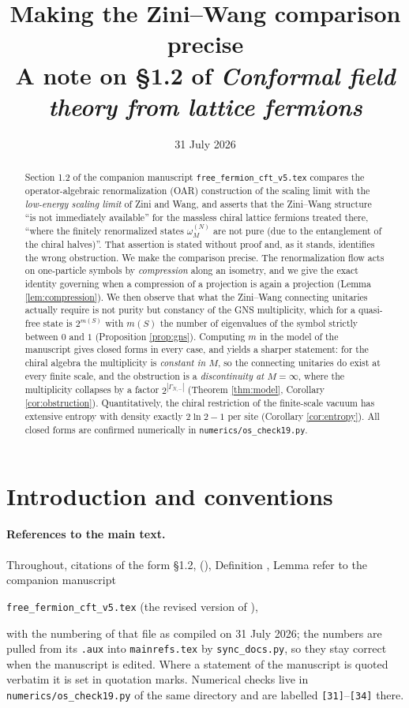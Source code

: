 \documentclass[11pt,a4paper]{article}
\title{\bf Making the Zini--Wang comparison precise\\[0.3cm]
\large A note on \S1.2 of \emph{Conformal field theory from lattice fermions}}
\author{}
\date{31 July 2026}
\theoremstyle{definition}
\newcommand{\1}{\mathds{1}}
\newcommand{\Gam}{\Gamma}
\begin{document}
\maketitle

\begin{abstract}
Section 1.2 of the companion manuscript \texttt{free\_fermion\_cft\_v5.tex} compares the
operator-algebraic renormalization (OAR) construction of the scaling limit with the
\emph{low-energy scaling limit} of Zini and Wang, and asserts that the Zini--Wang structure ``is not
immediately available'' for the massless chiral lattice fermions treated there, ``where the finitely
renormalized states $\omega^{(N)}_{M}$ are not pure (due to the entanglement of the chiral halves)''.
That assertion is stated without proof and, as it stands, identifies the wrong obstruction. We make
the comparison precise. The renormalization flow acts on one-particle symbols by \emph{compression}
along an isometry, and we give the exact identity governing when a compression of a projection is
again a projection (Lemma \ref{lem:compression}). We then observe that what the Zini--Wang
connecting unitaries actually require is not purity but constancy of the GNS multiplicity, which for
a quasi-free state is $2^{m(S)}$ with $m(S)$ the number of eigenvalues of the symbol strictly between
$0$ and $1$ (Proposition \ref{prop:gns}). Computing $m$ in the model of the manuscript gives closed
forms in every case, and yields a sharper statement: for the chiral algebra the multiplicity is
\emph{constant in $M$}, so the connecting unitaries do exist at every finite scale, and the
obstruction is a \emph{discontinuity at $M=\infty$}, where the multiplicity collapses by a factor
$2^{|\Gam_{N,-}|}$ (Theorem \ref{thm:model}, Corollary \ref{cor:obstruction}). Quantitatively, the
chiral restriction of the finite-scale vacuum has extensive entropy with density exactly
$2\ln2-1$ per site (Corollary \ref{cor:entropy}). All closed forms are confirmed numerically in
\texttt{numerics/os\_check19.py}.
\end{abstract}

\section{Introduction and conventions}
\label{sec:intro}

\paragraph{References to the main text.}
Throughout, citations of the form \S1.2, (\mrLatVac), Definition \mrDefMomRG, Lemma \mrJackson refer to the companion
manuscript
\begin{center}
\texttt{free\_fermion\_cft\_v5.tex} \quad(the revised version of \cite{OsborneStottmeister}),
\end{center}
with the numbering of that file as compiled on 31 July 2026; the numbers are pulled from its \texttt{.aux} into \texttt{mainrefs.tex} by \texttt{sync\_docs.py}, so they stay correct when the manuscript is edited. Where a statement of the manuscript is
quoted verbatim it is set in quotation marks. Numerical checks live in
\texttt{numerics/os\_check19.py} of the same directory and are labelled \texttt{[31]}--\texttt{[34]}
there.
\end{document}
